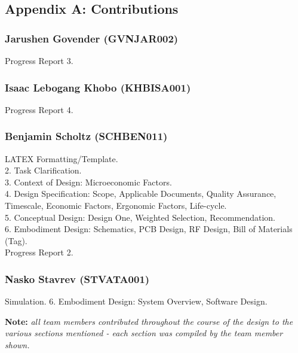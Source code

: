 \newpage





\newpage
\vspace*{\fill}
\begin{center}
\subsection*{Appendix A: Contributions}
\end{center}
\vspace*{\fill}

\newpage
\subsubsection*{Jarushen Govender (GVNJAR002)}
Progress Report 3.
\subsubsection*{Isaac Lebogang Khobo (KHBISA001)}
Progress Report 4.
\subsubsection*{Benjamin Scholtz (SCHBEN011)}
LATEX Formatting/Template. \\
2. Task Clarification. \\
3. Context of Design: Microeconomic Factors. \\
4. Design Specification: Scope, Applicable Documents, Quality Assurance, Timescale, Economic Factors, Ergonomic Factors, Life-cycle. \\
5. Conceptual Design: Design One, Weighted Selection, Recommendation. \\
6. Embodiment Design: Schematics, PCB Design, RF Design, Bill of Materials (Tag). \\
Progress Report 2.
\subsubsection*{Nasko Stavrev (STVATA001)}
Simulation.
6. Embodiment Design: System Overview, Software Design.

\vfill
\textbf{Note: }\textit{all team members contributed throughout the course of the design to the various sections mentioned - each section was compiled by the team member shown.}

